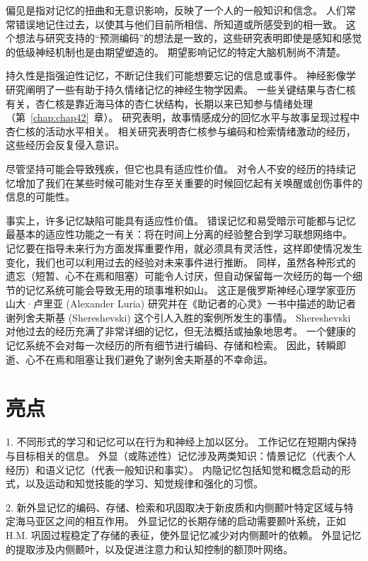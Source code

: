 偏见是指对记忆的扭曲和无意识影响，反映了一个人的一般知识和信念。
人们常常错误地记住过去，以使其与他们目前所相信、所知道或所感受到的相一致。
这个想法与研究支持的“预测编码”的想法是一致的，这些研究表明即使是感知和感觉的低级神经机制也是由期望塑造的。
期望影响记忆的特定大脑机制尚不清楚。


持久性是指强迫性记忆，不断记住我们可能想要忘记的信息或事件。
神经影像学研究阐明了一些有助于持久情绪记忆的神经生物学因素。
一些关键结果与杏仁核有关，杏仁核是靠近海马体的杏仁状结构，长期以来已知参与情绪处理（第~\ref{chap:chap42}~章）。
研究表明，故事情感成分的回忆水平与故事呈现过程中杏仁核的活动水平相关。
相关研究表明杏仁核参与编码和检索情绪激动的经历，这些经历会反复侵入意识。


尽管坚持可能会导致残疾，但它也具有适应性价值。
对令人不安的经历的持续记忆增加了我们在某些时候可能对生存至关重要的时候回忆起有关唤醒或创伤事件的信息的可能性。


事实上，许多记忆缺陷可能具有适应性价值。
错误记忆和易受暗示可能都与记忆最基本的适应性功能之一有关：将在时间上分离的经验整合到学习联想网络中。
记忆要在指导未来行为方面发挥重要作用，就必须具有灵活性，这样即使情况发生变化，我们也可以利用过去的经验对未来事件进行推断。
同样，虽然各种形式的遗忘（短暂、心不在焉和阻塞）可能令人讨厌，但自动保留每一次经历的每一个细节的记忆系统可能会导致无用的琐事堆积如山。
这正是俄罗斯神经心理学家亚历山大·卢里亚 (Alexander Luria) 研究并在《助记者的心灵》一书中描述的助记者谢列舍夫斯基 (Shereshevski) 这个引人入胜的案例所发生的事情。
Shereshevski 对他过去的经历充满了非常详细的记忆，但无法概括或抽象地思考。
一个健康的记忆系统不会对每一次经历的所有细节进行编码、存储和检索。
因此，转瞬即逝、心不在焉和阻塞让我们避免了谢列舍夫斯基的不幸命运。



\section{亮点}

1. 不同形式的学习和记忆可以在行为和神经上加以区分。 工作记忆在短期内保持与目标相关的信息。
外显（或陈述性）记忆涉及两类知识：情景记忆（代表个人经历）和语义记忆（代表一般知识和事实）。
内隐记忆包括知觉和概念启动的形式，以及运动和知觉技能的学习、知觉规律和强化的习惯。 


2. 新外显记忆的编码、存储、检索和巩固取决于新皮质和内侧颞叶特定区域与特定海马亚区之间的相互作用。
外显记忆的长期存储的启动需要颞叶系统，正如 H.M. 巩固过程稳定了存储的表征，使外显记忆减少对内侧颞叶的依赖。
外显记忆的提取涉及内侧颞叶，以及促进注意力和认知控制的额顶叶网络。



